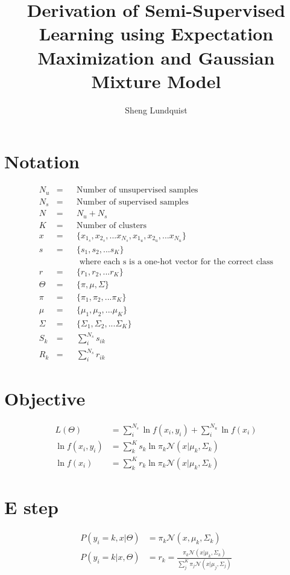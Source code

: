 \documentclass[11pt]{article}
\title{\bf Derivation of Semi-Supervised Learning using Expectation Maximization and Gaussian Mixture Model \\[2ex]}
\author{Sheng Lundquist}
\date{}
\begin{document}
\maketitle

\section{Notation}
\begin{align}
N_u &=&& \text{Number of unsupervised samples}\\
N_s &=&& \text{Number of supervised samples}\\
N &=&& N_u + N_s\\
K &=&& \text{Number of clusters}\\
x &=&& \{x_{1_s}, x_{2_s}, ... x_{N_s}, x_{1_u}, x_{2_u}, ... x_{N_u}\}\\
s &=&& \{s_{1}, s_{2}, ... s_{K}\} \\ 
  & &&\text{ where each s is a one-hot vector for the correct class}\\
r &=&& \{r_{1}, r_{2}, ... r_{K}\}\\
\Theta &=&& \{\pi, \mu, \Sigma\}\\
\pi &=&& \{\pi_{1}, \pi_{2}, ... \pi_{K}\}\\
\mu &=&& \{\mu_{1}, \mu_{2}, ... \mu_{K}\}\\
\Sigma &=&& \{\Sigma_{1}, \Sigma_{2}, ... \Sigma_{K}\}\\
S_k &=&& \sum_i^{N_s}{s_{ik}}\\
R_k &=&& \sum_i^{N_s}{r_{ik}}
\end{align}

\section{Objective}
\begin{align}
L(\Theta) &= \sum_{i}^{N_s}\ln f(x_i, y_i) + \sum_{i}^{N_u}\ln f(x_i)\\
\ln f(x_i, y_i) &= \sum_k^K s_k \ln \pi_k \mathcal{N}(x | \mu_k, \Sigma_k)\\
\ln f(x_i) &= \sum_k^K r_k \ln \pi_k \mathcal{N}(x | \mu_k, \Sigma_k)
\end{align}

\section{E step}
\begin{align}
P(y_i=k, x | \Theta) &= \pi_k \mathcal{N}(x, \mu_k, \Sigma_k)\\
P(y_i=k| x, \Theta) &= r_k = \frac{\pi_k \mathcal{N}(x | \mu_k, \Sigma_k)}{\sum_j^K \pi_j \mathcal{N}(x | \mu_j, \Sigma_j)}
\end{align}
\end{document}
